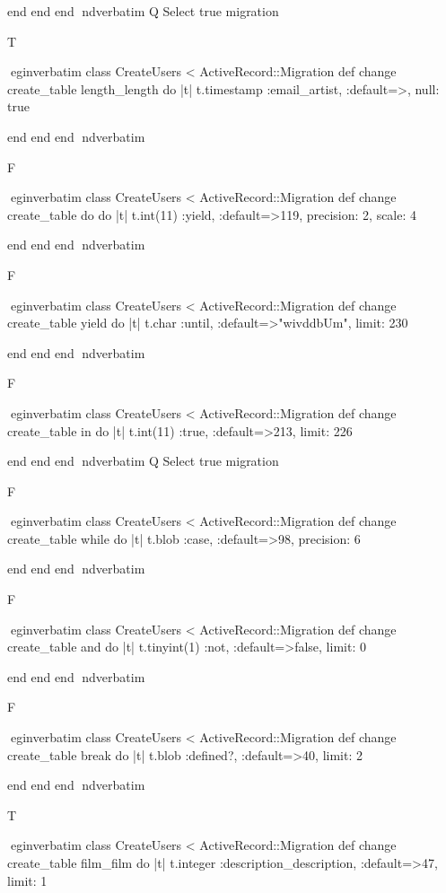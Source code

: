     end 
  end 
end
nd{verbatim}
Q
 Select true migration

T

egin{verbatim}
 class CreateUsers < ActiveRecord::Migration 
  def change 
    create_table length_length do |t| 
      t.timestamp :email_artist, :default=>, null: true
    
    end 
  end 
end
nd{verbatim}

F

egin{verbatim}
 class CreateUsers < ActiveRecord::Migration 
  def change 
    create_table do do |t| 
      t.int(11) :yield, :default=>119, precision: 2, scale: 4
    
    end 
  end 
end
nd{verbatim}

F

egin{verbatim}
 class CreateUsers < ActiveRecord::Migration 
  def change 
    create_table yield do |t| 
      t.char :until, :default=>"wivddbUm", limit: 230
    
    end 
  end 
end
nd{verbatim}

F

egin{verbatim}
 class CreateUsers < ActiveRecord::Migration 
  def change 
    create_table in do |t| 
      t.int(11) :true, :default=>213, limit: 226
    
    end 
  end 
end
nd{verbatim}
Q
 Select true migration

F

egin{verbatim}
 class CreateUsers < ActiveRecord::Migration 
  def change 
    create_table while do |t| 
      t.blob :case, :default=>98, precision: 6
    
    end 
  end 
end
nd{verbatim}

F

egin{verbatim}
 class CreateUsers < ActiveRecord::Migration 
  def change 
    create_table and do |t| 
      t.tinyint(1) :not, :default=>false, limit: 0
    
    end 
  end 
end
nd{verbatim}

F

egin{verbatim}
 class CreateUsers < ActiveRecord::Migration 
  def change 
    create_table break do |t| 
      t.blob :defined?, :default=>40, limit: 2
    
    end 
  end 
end
nd{verbatim}

T

egin{verbatim}
 class CreateUsers < ActiveRecord::Migration 
  def change 
    create_table film_film do |t| 
      t.integer :description_description, :default=>47, limit: 1
    
